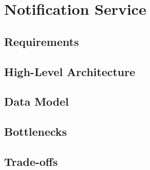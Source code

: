 \chapter{Notification Service}

\section{Requirements}
\section{High-Level Architecture}
\section{Data Model}
\section{Bottlenecks}
\section{Trade-offs}
